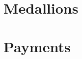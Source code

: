 \documentclass{article}
\begin{document}
\maketitle







    \section{\TOM{}}
    \label{sec:market}
    

    \section{Medallions}
    \label{medallions}
    

    \section{Payments}
    \label{sec:payments}
    

\end{document}
